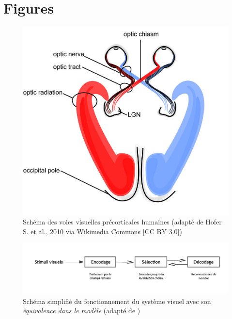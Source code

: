 
\chapter{Figures} %

\label{Figures} %


\begin{figure}[th]
\centering
\includegraphics{Figures/visual_system}
\decoRule %
\caption[Figure]{Schéma des voies visuelles précorticales humaines (adapté de Hofer S. et al., 2010 via Wikimedia Commons [CC BY 3.0])}
\label{fig:visual_system}
\end{figure}

\begin{figure}[th]
\centering
\includegraphics[scale=0.75]{Figures/visual_system_simple}
\decoRule %
\caption[Figure]{Schéma simplifié du fonctionnement du système visuel avec son \textit{équivalence dans le modèle} (adapté de \cite{Zhaoping2014})}
\label{fig:visual_system_simple}
\end{figure}

